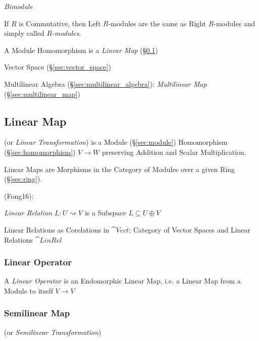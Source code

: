 \emph{Bimodule}

If $R$ is Commutative, then Left $R$-modules are the same as Right
$R$-modules and simply called \emph{$R$-modules}.

A Module Homomorphism is a \emph{Linear Map} (\S\ref{sec:linear_map})

Vector Space (\S\ref{sec:vector_space})

Multilinear Algebra (\S\ref{sec:multilinear_algebra}):
\emph{Multilinear Map} (\S\ref{sec:multilinear_map})



\subsection{Linear Map}\label{sec:linear_map}

(or \emph{Linear Transformation}) is a Module (\S\ref{sec:module})
Homomorphism (\S\ref{sec:homomorphism}) $V \rightarrow W$ preserving
Addition and Scalar Multiplication.

Linear Maps are Morphisms in the Category of Modules over a given Ring
(\S\ref{sec:ring}).

(Fong16):


\emph{Linear Relation} $L : U \rightsquigarrow V$ is a Subspace $L
\subseteq U \oplus V$

Linear Relations as Corelations in $\cat{Vect}$; Category of Vector
Spaces and Linear Relations $\cat{LinRel}$



\subsubsection{Linear Operator}\label{sec:linear_operator}

A \emph{Linear Operator} is an Endomorphic Linear Map, i.e. a Linear
Map from a Module to itself $V \rightarrow V$



\subsubsection{Semilinear Map}\label{sec:semilinear_map}

(or \emph{Semilinear Transformation})

